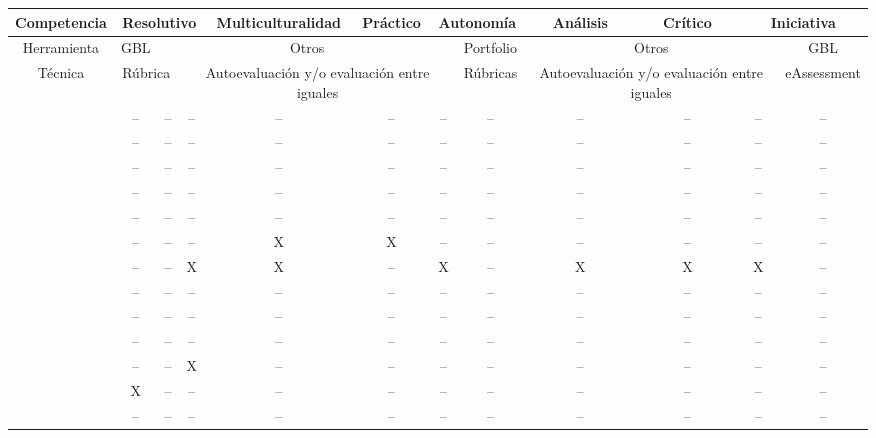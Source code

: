 \begin{landscape}
\begin{table}[H]
  \begin{center}
  \begin{tabular}{| c | c | c | c | c | c | c | c | c | c | c | c |}
    \hline
    \scriptsize{Competencia} & \multicolumn{3}{c|}{Resolutivo} & Multiculturalidad & Práctico & \multicolumn{2}{c|}{Autonomía} & Análisis & Crítico &  \multicolumn{2}{c|}{Iniciativa} \\
    \hline
    \scriptsize{Herramienta} & GBL & \multicolumn{5}{c|}{Otros} & Portfolio & \multicolumn{3}{c|}{Otros} & GBL \\
    \hline
    \scriptsize{Técnica} & \multicolumn{2}{c|}{Rúbrica} & \multicolumn{4}{c|}{Autoevaluación y/o evaluación entre iguales} & Rúbricas & \multicolumn{3}{c|}{Autoevaluación y/o evaluación entre iguales} & eAssessment \\
    \hline
    \hline 
    \cite{Shih:2011} 		& -- & -- & -- & -- & -- & -- & -- & -- & -- & -- & -- \\
    \hline
    \cite{MercedesRico:2013} 	& -- & -- & -- & -- & -- & -- & -- & -- & -- &  -- & -- \\
    \hline
    \cite{Masip-Alvarez:2013} 	& -- & -- & -- & -- & -- & -- & -- & -- & -- &  -- & --\\
    \hline
    \cite{Mohamed:2008} 	& -- & -- & -- & -- & -- & -- & -- & -- & -- &  -- & --\\
    \hline
    \cite{Piedra:2010} 		& -- & -- & -- & -- & -- & -- & -- & -- & -- & -- & -- \\
    \hline
    \cite{Liao:2013} 		& -- & -- & -- & X  & X  & -- & -- & -- & -- & -- & -- \\
    \hline
    \cite{Colomo-Palacios:2013} & -- & -- &  X &  X & -- & X  & -- & X & X & X & -- \\ %
    \hline
    \cite{McMahon:2007} 	& -- & -- & -- & -- & -- & -- & -- & -- & -- & -- & -- \\
    \hline
    \cite{Rashid:2008} 		& -- & -- & -- & -- & -- & -- & -- & -- & -- &  -- & -- \\
    \hline
    \cite{Lim:2011} 		& -- & -- & -- & -- & -- & -- & -- & -- & -- & -- & -- \\
    \hline
    \cite{Achcaoucaou:2012} 	& -- & -- & X & -- & -- & -- & -- & -- & -- &  -- & -- \\
    \hline
    \cite{Guenaga:2013} 	& X & -- & -- & -- & -- & -- & -- & -- &  -- & -- & -- \\
    \hline
    \cite{Martin-Cuadrado:2013} & -- & -- & -- & -- & -- & -- & -- & -- &  -- & -- & -- \\

\end{tabular}
\end{center}
\end{table}
\end{landscape}
